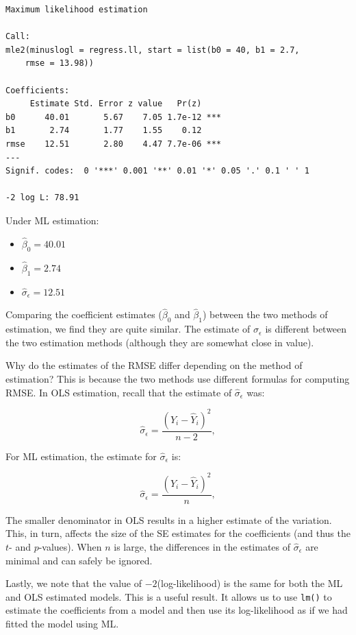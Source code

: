 \documentclass[]{book}
\providecommand{\tightlist}{%
  \setlength{\itemsep}{0pt}\setlength{\parskip}{0pt}}
\begin{document}
\begin{verbatim}
Maximum likelihood estimation

Call:
mle2(minuslogl = regress.ll, start = list(b0 = 40, b1 = 2.7, 
    rmse = 13.98))

Coefficients:
     Estimate Std. Error z value   Pr(z)    
b0      40.01       5.67    7.05 1.7e-12 ***
b1       2.74       1.77    1.55    0.12    
rmse    12.51       2.80    4.47 7.7e-06 ***
---
Signif. codes:  0 '***' 0.001 '**' 0.01 '*' 0.05 '.' 0.1 ' ' 1

-2 log L: 78.91 
\end{verbatim}

Under ML estimation:

\begin{itemize}
\tightlist
\item
  \(\hat\beta_0 = 40.01\)
\item
  \(\hat\beta_1 = 2.74\)
\item
  \(\hat\sigma_\epsilon = 12.51\)
\end{itemize}

Comparing the coefficient estimates (\(\hat\beta_0\) and \(\hat\beta_1\)) between the two methods of estimation, we find they are quite similar. The estimate of \(\sigma_{\epsilon}\) is different between the two estimation methods (although they are somewhat close in value).

Why do the estimates of the RMSE differ depending on the method of estimation? This is because the two methods use different formulas for computing RMSE. In OLS estimation, recall that the estimate of \(\hat\sigma_\epsilon\) was:

\[
\hat\sigma_{\epsilon}=\frac{\left(Y_i - \hat{Y}_i\right)^2}{n-2},
\]

For ML estimation, the estimate for \(\hat\sigma_\epsilon\) is:

\[
\hat\sigma_{\epsilon}=\frac{\left(Y_i - \hat{Y}_i\right)^2}{n},
\]

The smaller denominator in OLS results in a higher estimate of the variation. This, in turn, affects the size of the SE estimates for the coefficients (and thus the \(t\)- and \(p\)-values). When \(n\) is large, the differences in the estimates of \(\hat\sigma_\epsilon\) are minimal and can safely be ignored.

Lastly, we note that the value of \(-2\)(log-likelihood) is the same for both the ML and OLS estimated models. This is a useful result. It allows us to use \texttt{lm()} to estimate the coefficients from a model and then use its log-likelihood as if we had fitted the model using ML.
\end{document}
